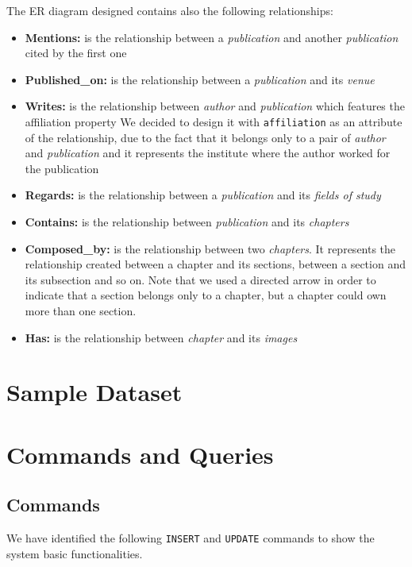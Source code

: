 \documentclass{Configuration_Files/PoliMi3i_thesis}
\begin{document}
The ER diagram designed contains also the following relationships:
\begin{itemize}
	\item \textbf{Mentions:} is the relationship between a \emph{publication} and another \emph{publication} cited by the first one
	\item \textbf{Published\_on:} is the relationship between a \emph{publication} and its \emph{venue}
	\item \textbf{Writes:} is the relationship between \emph{author} and \emph{publication} which features the affiliation property
		We decided to design it with \verb |affiliation| as an attribute of the relationship, due to the fact that it belongs
		only to a pair of \emph{author} and \emph{publication} and it represents the institute where the author worked for the publication
	\item \textbf{Regards:} is the relationship between a \emph{publication} and its \emph{fields of study}
	\item \textbf{Contains:} is the relationship between \emph{publication} and its \emph{chapters} 
	\item \textbf{Composed\_by:} is the relationship between two \emph{chapters}. It represents the relationship created
		between a chapter and its sections, between a section and its subsection and so on. Note that we used a directed
		arrow in order to indicate that a section belongs only to a chapter, but a chapter could own more than one section.
	\item \textbf{Has:} is the relationship between \emph{chapter} and its \emph{images}
\end{itemize}



\chapter{Sample Dataset}
\label{ch:sample_dataset}


\chapter{Commands and Queries}
\label{ch:ceq}
\section{Commands}
We have identified the following \verb |INSERT| and \verb |UPDATE| commands to show the system basic functionalities.
\end{document}
